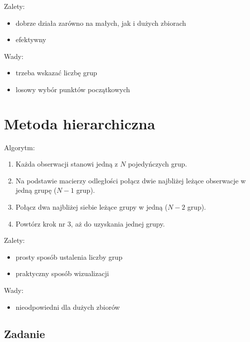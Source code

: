 \documentclass[]{book}
\providecommand{\tightlist}{%
  \setlength{\itemsep}{0pt}\setlength{\parskip}{0pt}}
\begin{document}
Zalety:

\begin{itemize}
\tightlist
\item
  dobrze działa zarówno na małych, jak i dużych zbiorach
\item
  efektywny
\end{itemize}

Wady:

\begin{itemize}
\tightlist
\item
  trzeba wskazać liczbę grup
\item
  losowy wybór punktów początkowych
\end{itemize}

\section{Metoda hierarchiczna}\label{metoda-hierarchiczna}

Algorytm:

\begin{enumerate}
\def\labelenumi{\arabic{enumi}.}
\tightlist
\item
  Każda obserwacji stanowi jedną z \(N\) pojedyńczych grup.
\item
  Na podstawie macierzy odległości połącz dwie najbliżej leżące
  obserwacje w jedną grupę (\(N-1\) grup).
\item
  Połącz dwa najbliżej siebie leżące grupy w jedną (\(N-2\) grup).
\item
  Powtórz krok nr 3, aż do uzyskania jednej grupy.
\end{enumerate}

Zalety:

\begin{itemize}
\tightlist
\item
  prosty sposób ustalenia liczby grup
\item
  praktyczny sposób wizualizacji
\end{itemize}

Wady:

\begin{itemize}
\tightlist
\item
  nieodpowiedni dla dużych zbiorów
\end{itemize}

\subsection{Zadanie}\label{zadanie-2}
\end{document}
